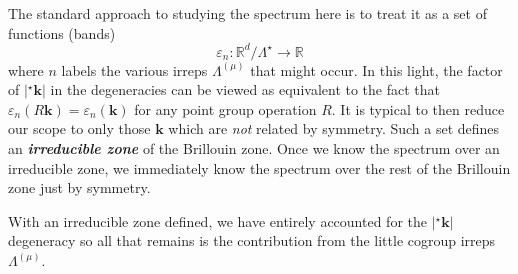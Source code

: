 \documentclass[9 pt]{report}
\def\*#1{\boldsymbol{#1}}
\begin{document}
The standard approach to studying the spectrum here is to treat it as a set of functions (bands)
$$ \varepsilon_n: \mathbb{R}^d/\Lambda^\star \to \mathbb{R} $$
where $n$ labels the various irreps $\Lambda^{(\mu)}$ that might occur. In this light, the factor of $|^\star\*k|$ in the degeneracies can be viewed as equivalent to the fact that $\varepsilon_n(R\*k)=\varepsilon_n(\*k)$ for any point group operation $R$. It is typical to then reduce our scope to only those $\*k$ which are \emph{not} related by symmetry. Such a set defines an \textbf{\emph{irreducible zone}} of the Brillouin zone. Once we know the spectrum over an irreducible zone, we immediately know the spectrum over the rest of the Brillouin zone just by symmetry. 

With an irreducible zone defined, we have entirely accounted for the $|^\star\*k|$ degeneracy so all that remains is the contribution from the little cogroup irreps $\Lambda^{(\mu)}$.
\end{document}
